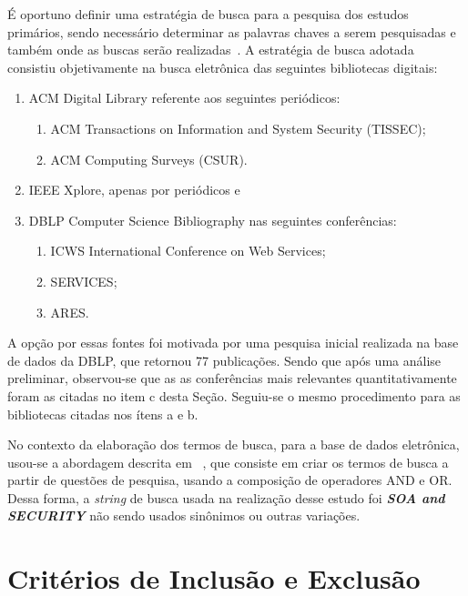   É oportuno definir uma estratégia de busca para a pesquisa dos estudos primários, sendo necessário determinar as palavras chaves a serem pesquisadas e também  onde as buscas serão realizadas~\cite{guidelines-2007}.
A estratégia de busca adotada consistiu objetivamente na busca eletrônica das seguintes bibliotecas digitais:
\begin{enumerate}[ a )]
    \item ACM Digital Library referente aos seguintes periódicos:
       \begin{enumerate}
            \item ACM Transactions on Information and System Security (TISSEC);
            \item ACM Computing Surveys (CSUR).
       \end{enumerate}

    \item IEEE Xplore, apenas por periódicos e
    \item DBLP Computer Science Bibliography nas seguintes conferências:
      \begin{enumerate}
            \item ICWS International Conference on Web Services;
            \item SERVICES;
            \item ARES.
      \end{enumerate}

\end{enumerate}

A opção por essas fontes foi motivada por uma pesquisa inicial realizada na base de dados  da DBLP, que retornou 77 publicações. Sendo que após uma análise preliminar, observou-se que as as conferências mais relevantes quantitativamente foram as citadas no item c desta Seção. Seguiu-se o mesmo procedimento para as bibliotecas citadas nos ítens a e b.

No contexto da elaboração dos termos de busca, para  a base de dados eletrônica, usou-se a abordagem descrita em ~\cite{guidelines-2007}, que consiste em criar os termos de busca a partir de questões de pesquisa, usando a composição de operadores AND e OR. Dessa forma,  a \emph{string} de busca usada na realização desse estudo foi \textbf{\emph{SOA and SECURITY}} não sendo  usados sinônimos ou outras variações.

\section{Critérios de Inclusão e Exclusão}

